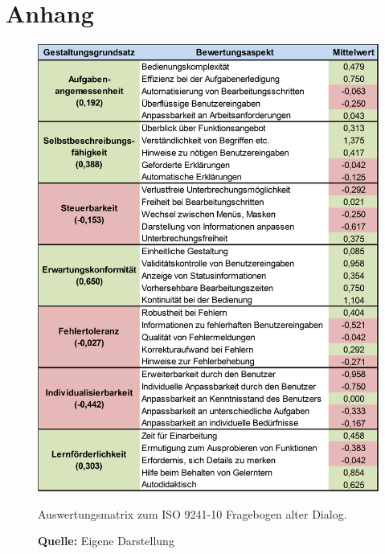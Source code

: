 \section*{Anhang}

\anhangsverzeichnis

\begin{minipage}{\textwidth}
\begin{figure}[H]
  \centering
  \includegraphics[width=430px]{img/Auswertungsmatrix_Alter_Dialog.PNG}
  \caption{Auswertungsmatrix zum ISO 9241-10 Fragebogen alter Dialog.}
  \caption*{\textbf{Quelle:} Eigene Darstellung}
  \label{fig:auswertungsmatrixAlterDialog}
\end{figure}
\end{minipage}

